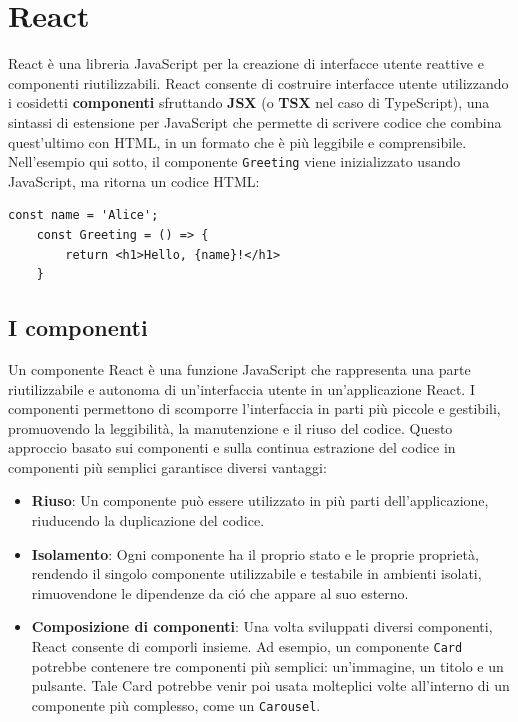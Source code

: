 \documentclass[target=bach,aauheader=,style=]{thud}
\begin{document}
\section{React}
React è una libreria JavaScript per la creazione di interfacce utente reattive e componenti riutilizzabili. React consente di costruire interfacce utente utilizzando i cosidetti \textbf{componenti} sfruttando \textbf{JSX} (o \textbf{TSX} nel caso di TypeScript), una sintassi di estensione per JavaScript che permette di scrivere codice che combina quest'ultimo con HTML, in un formato che è più leggibile e comprensibile. Nell'esempio qui sotto,  il componente \texttt{Greeting} viene inizializzato usando JavaScript, ma ritorna un codice HTML:

\begin{lstlisting}[language=React, caption=Esempio di codice React]
    const name = 'Alice';   
    const Greeting = () => {
        return <h1>Hello, {name}!</h1>
    } 
\end{lstlisting}

\subsection{I componenti}
Un componente React è una funzione JavaScript che rappresenta una parte riutilizzabile e autonoma di un'interfaccia utente in un'applicazione React. I componenti permettono di scomporre l'interfaccia in parti più piccole e gestibili, promuovendo la leggibilità, la manutenzione e il riuso del codice. Questo approccio basato sui componenti e sulla continua estrazione del codice in componenti più semplici garantisce diversi vantaggi:

\begin{itemize}
    \item \textbf{Riuso}: Un componente può essere utilizzato in più parti dell'applicazione, riuducendo la duplicazione del codice.
    \item \textbf{Isolamento}: Ogni componente ha il proprio stato e le proprie proprietà, rendendo il singolo componente utilizzabile e testabile in ambienti isolati, rimuovendone le dipendenze da ció che appare al suo esterno.
    \item \textbf{Composizione di componenti}: Una volta sviluppati diversi componenti, React consente di comporli insieme. Ad esempio, un componente \texttt{Card} potrebbe contenere tre componenti più semplici: un'immagine, un titolo e un pulsante. Tale Card potrebbe venir poi usata molteplici volte all'interno di un componente più complesso, come un \texttt{Carousel}.
\end{itemize}
\end{document}
